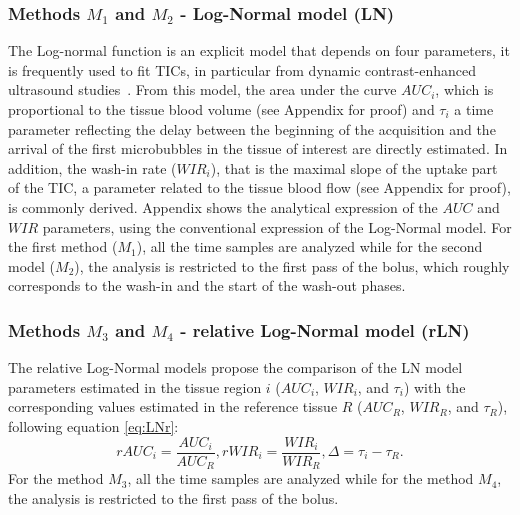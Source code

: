 \subsubsection{Methods $M_1$ and $M_2$ - Log-Normal model (LN)}
The Log-normal function is an explicit model that depends on four parameters, it is frequently used to fit TICs, in particular from dynamic contrast-enhanced ultrasound studies~\cite{Strouthos2010it}.
From this model, the area under the curve $AUC_i$, which is proportional to the tissue blood volume (see Appendix for proof) and $\tau_i$ a time parameter reflecting the delay between the beginning of the acquisition and the arrival of the first microbubbles in the tissue of interest are directly estimated. In addition, the wash-in rate ($WIR_i$), that is the maximal slope of the uptake part of the TIC, a parameter related to the tissue blood flow (see Appendix for proof), is commonly derived. Appendix shows the analytical expression of the $AUC$ and $WIR$ parameters, using the conventional expression of the Log-Normal model.
For the first method ($M_1$), all the time samples are analyzed while for the second model ($M_2$), the analysis is restricted to the first pass of the bolus, which roughly corresponds to the wash-in and the start of the wash-out phases.

\subsubsection{Methods $M_3$ and $M_4$ - relative Log-Normal model (rLN)}
The relative Log-Normal models propose the comparison of the LN model parameters estimated in the tissue region $i$ ($AUC_i$, $WIR_i$, and $\tau_i$) with the corresponding values estimated in the reference tissue $R$ ($AUC_R$, $WIR_R$, and $\tau_R$), following equation \ref{eq:LNr}:
 \begin{equation}
 rAUC_i = \frac {AUC_i} {AUC_R}, rWIR_i = \frac {WIR_i} {WIR_R}, \Delta = \tau_i - \tau_{R}.
 \label{eq:LNr}
\end{equation}
For the method $M_3$, all the time samples are analyzed while for the method $M_4$, the analysis is restricted to the first pass of the bolus.

